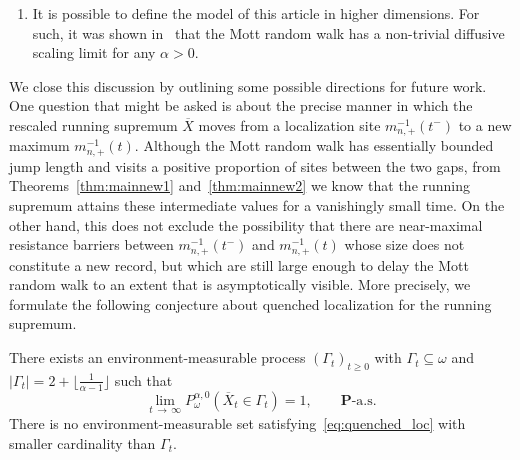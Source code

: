 \documentclass[AHL,Unicode,longabstracts,published]{cedram}
\renewcommand{\P}{\mathbb P}
\newcommand{\bfP}{\mathbf{P}}
\begin{document}
\begin{rema}
\begin{enumerate}
\[\]
in $\P^{\alpha,\lambda}$-probability, and thus
\[
\P^{\alpha,\lambda}\left(\left(n^{-1}{X}_{L^{-1}(nt)}\right)_{t\,\geq\,0}\in\cdot\right)\rightarrow\bfP\left(\left(m_+^{-1}(t)\right)_{t\,\geq\,0}\in\cdot\right).
\]
In particular, because in this case the walk moves to the right with little backtracking, the exceedance times $(\Delta^+_x)_{x\,\geq\,0}$ should behave like a sum of i.i.d.\ random variables, each representing the time to cross a resistance barrier (which has order proportional to the size of the barrier). Thus we anticipate the exceedance times to grow asymptotically in the same way as the nearest-neighbour resistance, see~\eqref{rscal}, and taking inverses yields the above conclusions. Note that, in contrast to Theorem~\ref{thm:mainnew1}, there is no additional $n$ in the scaling, as the excursions away from the current maximum should not play a significant role in this case.
\item It is possible to define the model of this article in higher dimensions. For such, it was shown in~\cite{CFP} that the Mott random walk has a non-trivial diffusive scaling limit for any $\alpha>0$.
\end{enumerate}
\end{rema}

We close this discussion by outlining some possible directions for future work. One question that might be asked is about the precise manner in which the rescaled running supremum $\overline X$ moves from a localization site $m_{n,+}^{-1}(t^-)$ to a new maximum $m_{n,+}^{-1}(t)$. Although the Mott random walk has essentially bounded jump length and visits a positive proportion of sites between the two gaps, from Theorems~\ref{thm:mainnew1} and~\ref{thm:mainnew2} we know that the running supremum attains these intermediate values for a vanishingly small time. On the other hand, this does not exclude the possibility that there are near-maximal resistance barriers between $m_{n,+}^{-1}(t^-)$ and $m_{n,+}^{-1}(t)$ whose size does not constitute a new record, but which are still large enough to delay the Mott random walk to an extent that is asymptotically visible. More precisely, we formulate the following conjecture about quenched localization for the running supremum.

\begin{conj}\label{con:quenched}
There exists an environment-measurable process $(\Gamma_t)_{t\geq 0}$ with $\Gamma_t\subseteq\omega$ and $|\Gamma_t|=2+\lfloor\frac{1}{\alpha-1}\rfloor$ such that
\begin{equation}\label{eq:quenched_loc}
\lim_{t\,\to\,\infty}P^{\alpha,0}_\omega\left(\overline X_t\in\Gamma_t\right)=1,\qquad \bfP\text{-a.s.}
\end{equation}
There is no environment-measurable set satisfying~\eqref{eq:quenched_loc} with smaller cardinality than $\Gamma_t$.
\end{conj}
\end{document}
